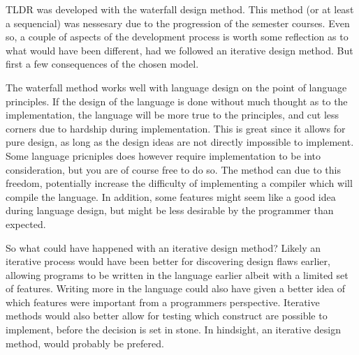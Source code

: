 TLDR was developed with the waterfall design method. This method (or at least a sequencial) was nessesary due to the progression of the semester courses. Even so, a couple of aspects of the development process is worth some reflection as to what would have been different, had we followed an iterative design method. But first a few consequences of the chosen model.

The waterfall method works well with language design on the point of language principles. If the design of the language is done without much thought as to the implementation, the language will be more true to the principles, and cut less corners due to hardship during implementation. This is great since it allows for pure design, as long as the design ideas are not directly impossible to implement. Some language pricniples does however require implementation to be into consideration, but you are of course free to do so. The method can due to this freedom, potentially increase the difficulty of implementing a compiler which will compile the language. In addition, some features might seem like a good idea during language design, but might be less desirable by the programmer than expected.

So what could have happened with an iterative design method? Likely an iterative process would have been better for discovering design flaws earlier, allowing programs to be written in the language earlier albeit with a limited set of features. Writing more in the language could also have given a better idea of which features were important from a programmers perspective. Iterative methods would also better allow for testing which construct are possible to implement, before the decision is set in stone. In hindsight, an iterative design method, would probably be prefered.


